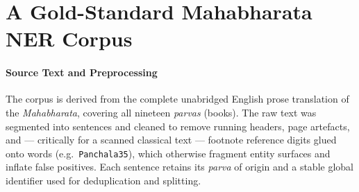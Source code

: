 \documentclass[conference]{IEEEtran}
\begin{document}
















\section{A Gold-Standard Mahabharata NER Corpus}
\label{sec:dataset}

\paragraph{Source Text and Preprocessing}
The corpus is derived from the complete unabridged English prose translation of the \emph{Mahabharata}, covering all nineteen \emph{parvas} (books). The raw text was segmented into sentences and cleaned to remove running headers, page artefacts, and --- critically for a scanned classical text --- footnote reference digits glued onto words (e.g.\ \texttt{Panchala35}), which otherwise fragment entity surfaces and inflate false positives. Each sentence retains its \emph{parva} of origin and a stable global identifier used for deduplication and splitting.
\end{document}
